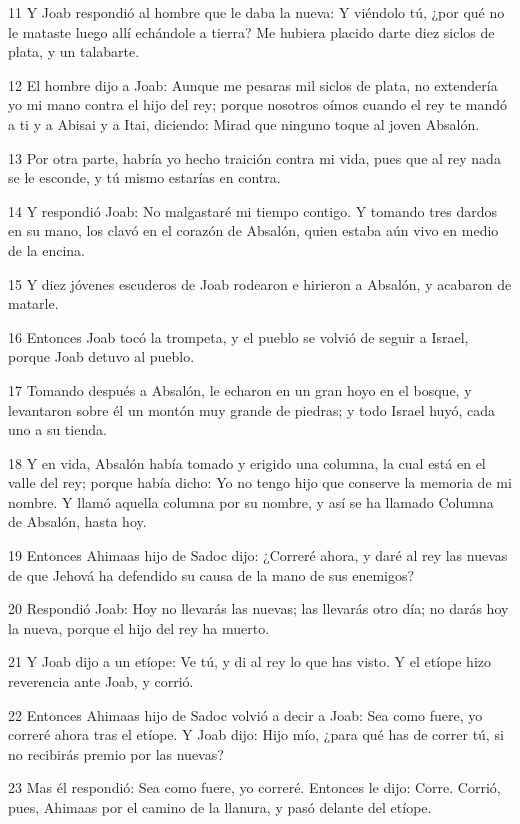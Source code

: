 \par 11 Y Joab respondió al hombre que le daba la nueva: Y viéndolo tú, ¿por qué no le mataste luego allí echándole a tierra? Me hubiera placido darte diez siclos de plata,  y un talabarte.
\par 12 El hombre dijo a Joab: Aunque me pesaras mil siclos de plata,  no extendería yo mi mano contra el hijo del rey; porque nosotros oímos cuando el rey te mandó a ti y a Abisai y a Itai, diciendo: Mirad que ninguno toque al joven Absalón.
\par 13 Por otra parte, habría yo hecho traición contra mi vida, pues que al rey nada se le esconde, y tú mismo estarías en contra. 
\par 14 Y respondió Joab: No malgastaré mi tiempo contigo. Y tomando tres dardos en su mano, los clavó en el corazón de Absalón, quien estaba aún vivo en medio de la encina.
\par 15 Y diez jóvenes escuderos de Joab rodearon e hirieron a Absalón, y acabaron de matarle.
\par 16 Entonces Joab tocó la trompeta, y el pueblo se volvió de seguir a Israel, porque Joab detuvo al pueblo.
\par 17 Tomando después a Absalón, le echaron en un gran hoyo en el bosque, y levantaron sobre él un montón muy grande de piedras; y todo Israel huyó, cada uno a su tienda.
\par 18 Y en vida, Absalón había tomado y erigido una columna, la cual está en el valle del rey; porque había dicho: Yo no tengo hijo que conserve la memoria de mi nombre. Y llamó aquella columna por su nombre, y así se ha llamado Columna de Absalón, hasta hoy.
\par 19 Entonces Ahimaas hijo de Sadoc dijo: ¿Correré ahora, y daré al rey las nuevas de que Jehová ha defendido su causa de la mano de sus enemigos?
\par 20 Respondió Joab: Hoy no llevarás las nuevas; las llevarás otro día; no darás hoy la nueva, porque el hijo del rey ha muerto.
\par 21 Y Joab dijo a un etíope: Ve tú, y di al rey lo que has visto. Y el etíope hizo reverencia ante Joab, y corrió.
\par 22 Entonces Ahimaas hijo de Sadoc volvió a decir a Joab: Sea como fuere, yo correré ahora tras el etíope. Y Joab dijo: Hijo mío, ¿para qué has de correr tú, si no recibirás premio por las nuevas?
\par 23 Mas él respondió: Sea como fuere, yo correré. Entonces le dijo: Corre. Corrió, pues, Ahimaas por el camino de la llanura, y pasó delante del etíope.
